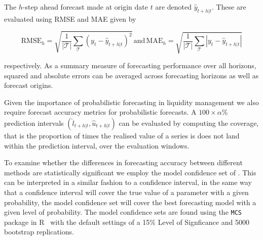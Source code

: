 \documentclass{article}
\begin{document}
The $h$-step ahead forecast made at origin date $t$ are denoted $\hat{y}_{t+h|t}$. These are evaluated using RMSE and MAE given by

\[
\textrm{RMSE}_h=\sqrt{\frac{1}{|\mathcal{T}|}\sum_\mathcal{T}(y_t-\hat{y}_{t+h|t})^2}\,\textrm{and}\,\textrm{MAE}_h=\sqrt{\frac{1}{|\mathcal{T}|}\sum_\mathcal{T}|y_t-\hat{y}_{t+h|t}|}
\]

respectively. As a summary measure of forecasting performance over all horizons, squared and absolute errors can be averaged across forecasting horizons as well as forecast origins.

Given the importance of probabilistic forecasting in liquidity management we also require forecast accuracy metrics for probabilistic forecasts. A $100\times\alpha$\% prediction intervals $(\hat{l}_{t+h|t},\hat{u}_{t+h|t})$ can be evaluated by computing the coverage, that is the proportion of times the realised value of a series is does not land within the prediction interval, over the evaluation windows. 

To examine whether the differences in forecasting accuracy between different methods are statistically significant we employ the model confidence set of \citet{HanEtAl2011}. This can be interpreted in a similar fashion to a confidence interval, in the same way that a confidence interval will cover the true value of a parameter with a given probability, the model confidence set will cover the best forecasting model with a given level of probability. The model confidence sets are found using the \texttt{MCS} package in R~\citep{MCSpac} with the default settings of a 15\% Level of Signficance and 5000 bootstrap replications.



\end{document}
